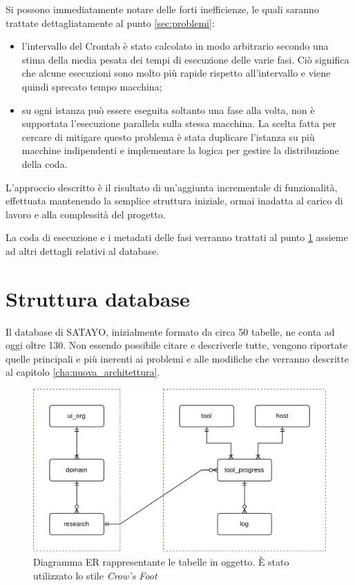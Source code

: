 Si possono immediatamente notare delle forti inefficienze, le quali saranno trattate
dettagliatamente al punto \ref{sec:problemi}:

\begin{itemize}
  \item l'intervallo del Crontab è stato calcolato in modo arbitrario secondo una
    stima della media pesata dei tempi di esecuzione delle varie fasi. Ciò
    significa che alcune esecuzioni sono molto più rapide rispetto all'intervallo
    e viene quindi sprecato tempo macchina;

  \item su ogni istanza può essere eseguita soltanto una fase alla volta, non è
    supportata l'esecuzione parallela sulla stessa macchina. La scelta fatta per
    cercare di mitigare questo problema è stata duplicare l'istanza su più macchine
    indipendenti e implementare la logica per gestire la distribuzione della coda.
\end{itemize}

L'approccio descritto è il risultato di un'aggiunta incrementale di funzionalità,
effettuata mantenendo la semplice struttura iniziale, ormai inadatta al carico
di lavoro e alla complessità del progetto.

La coda di esecuzione e i metadati delle fasi verranno trattati al punto
\ref{sec:database} assieme ad altri dettagli relativi al database.

\section{Struttura database}
\label{sec:database}

Il database di SATAYO, inizialmente formato da circa 50 tabelle, ne conta ad oggi
oltre 130. Non essendo possibile citare e descriverle tutte, vengono riportate
quelle principali e più inerenti ai problemi e alle modifiche che verranno
descritte al capitolo \ref{cha:nuova_architettura}.

\begin{figure}[htbp]
  \centering
  \includegraphics[width=.8\linewidth]{images/SATAYO_db-core-er.png}
  \caption{Diagramma ER rappresentante le tabelle in oggetto. È stato utilizzato
  lo stile \textit{Crow's Foot}\cite{everest1976basic}}
  \label{fig:er_diagram}
\end{figure}

